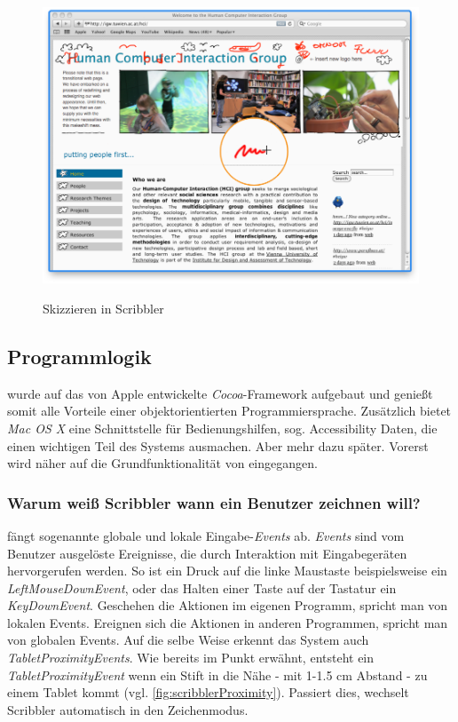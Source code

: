 \begin{figure}
        {\includegraphics[width=1\linewidth]{gfx/scribblerSketching}}
		\caption[Skizzieren in Scribbler]{Skizzieren in Scribbler}\label{fig:scribblerSketching}
\end{figure}

\subsection{Programmlogik} \label{sec:programmLogik} 
\scribbler wurde auf das von Apple entwickelte \emph{Cocoa}-Framework aufgebaut und genießt somit alle Vorteile einer objektorientierten Programmiersprache. Zusätzlich bietet \emph{Mac OS X} eine Schnittstelle für Bedienungshilfen, sog. Accessibility Daten, die einen wichtigen Teil des Systems ausmachen. Aber mehr dazu später. Vorerst wird näher auf die Grundfunktionalität von \scribbler eingegangen.

\subsubsection* {Warum weiß Scribbler wann ein Benutzer zeichnen will?}
\scribbler fängt sogenannte globale und lokale Eingabe-\emph{Events} ab. \emph{Events} sind vom Benutzer ausgelöste Ereignisse, die durch Interaktion mit Eingabegeräten hervorgerufen werden. So ist ein Druck auf die linke Maustaste beispielsweise ein \emph{LeftMouseDownEvent}, oder das Halten einer Taste auf der Tastatur ein \emph{KeyDownEvent}. Geschehen die Aktionen im eigenen Programm, spricht man von lokalen Events. Ereignen sich die Aktionen in anderen Programmen, spricht man von globalen Events. Auf die selbe Weise erkennt das System auch \emph{TabletProximityEvents}. Wie bereits im Punkt  erwähnt, entsteht ein \emph{TabletProximityEvent} wenn ein Stift in die Nähe - mit 1-1.5 cm Abstand - zu einem Tablet kommt (vgl. \autoref{fig:scribblerProximity}). Passiert dies, wechselt Scribbler automatisch in den Zeichenmodus. 

